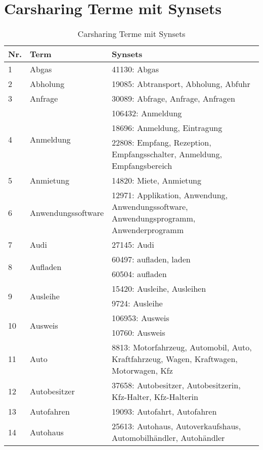 %
\section{Carsharing Terme mit Synsets}\label{sec:list_term_synsets}
\begin{longtable}{|m{1cm}|m{4.5cm}|m{7.5cm}|}
	\caption{Carsharing Terme mit Synsets}\label{tbl:car_terme_synsets}\\%
	\hline
	\textbf{Nr.} & \textbf{Term} & \textbf{Synsets}\\
	\hline \hline
	1 & Abgas & 41130: Abgas\\
	\hline
	2 & Abholung & 19085: Abtransport, Abholung, Abfuhr\\
	\hline
	3 & Anfrage & 30089: Abfrage, Anfrage, Anfragen\\
	\hline
	\multirow{3}{*}{4} & \multirow{3}{*}{Anmeldung} & 106432: Anmeldung\\
	& & 18696: Anmeldung, Eintragung\\
	\hline
	& & 22808: Empfang, Rezeption, Empfangsschalter, Anmeldung, Empfangsbereich\\
	\hline
	5 & Anmietung & 14820: Miete, Anmietung\\
	\hline
	6 & Anwendungssoftware & 12971: Applikation, Anwendung, Anwendungssoftware, Anwendungsprogramm, Anwenderprogramm\\
	\hline
	7 & Audi & 27145: Audi\\
	\hline
	\multirow{2}{*}{8} & \multirow{2}{*}{Aufladen} & 60497: aufladen, laden\\
	& & 60504: aufladen\\
	\hline
	\multirow{2}{*}{9} & \multirow{2}{*}{Ausleihe} & 15420: Ausleihe, Ausleihen\\
	& & 9724: Ausleihe\\
	\hline
	\multirow{2}{*}{10} & \multirow{2}{*}{Ausweis} & 106953: Ausweis\\
	& & 10760: Ausweis\\
	\hline
	11 & Auto & 8813: Motorfahrzeug, Automobil, Auto, Kraftfahrzeug, Wagen, Kraftwagen, Motorwagen, Kfz\\
	\hline
	12 & Autobesitzer & 37658: Autobesitzer, Autobesitzerin, Kfz-Halter, Kfz-Halterin\\
	\hline
	13 & Autofahren & 19093: Autofahrt, Autofahren\\
	\hline
	14 & Autohaus & 25613: Autohaus, Autoverkaufshaus, Automobilhändler, Autohändler\\

\end{longtable}
